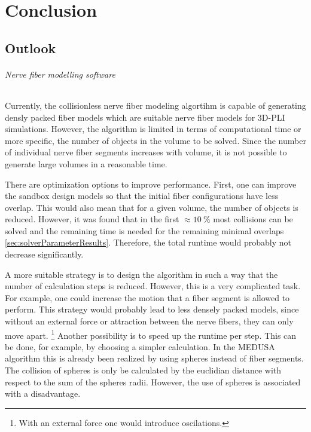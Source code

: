 \newpage\null\thispagestyle{empty}\newpage
\clearpage{\thispagestyle{empty}\cleardoublepage}
\part{Conclusion}
% 
% 
% 
\setcounter{chapter}{8}
\chapter{Outlook}
\label{sec:outlook}
% 
\paragraph{Nerve fiber modelling software}
% 
Currently, the collisionless nerve fiber modeling algortihm is capable of generating densly packed fiber models which are suitable nerve fiber models for \ac{3D-PLI} simulations.
However, the algorithm is limited in terms of computational time or more specific, the number of objects in the volume to be solved.
Since the number of individual nerve fiber segments increases with volume, it is not possible to generate large volumes in a reasonable time.
\par
% 
There are optimization options to improve performance.
First, one can improve the sandbox design models so that the initial fiber configurations have less overlap.
This would also mean that for a given volume, the number of objects is reduced.
However, it was found that in the first $\approx \SI{10}{\percent}$ most collisions can be solved and the remaining time is needed for the remaining minimal overlaps \cref{sec:solverParameterResults}.
Therefore, the total runtime would probably not decrease significantly.
\par
% 
A more suitable strategy is to design the algorithm in such a way that the number of calculation steps is reduced.
However, this is a very complicated task.
For example, one could increase the motion that a fiber segment is allowed to perform.
This strategy would probably lead to less densely packed models, since without an external force or attraction between the nerve fibers, they can only move apart. \footnote{With an external force one would introduce oscilations.}
Another possibility is to speed up the runtime per step.
This can be done, for example, by choosing a simpler calculation.
In the \ac{MEDUSA} algorithm this is already been realized by using spheres instead of fiber segments.
The collision of spheres is only be calculated by the euclidian distance with respect to the sum of the spheres radii.
However, the use of spheres is associated with a disadvantage.
